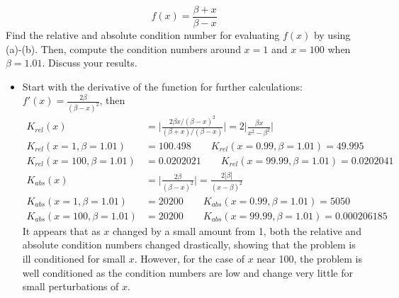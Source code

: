 \documentclass[10pt]{article}
\begin{document}
\begin{enumerate}
\begin{enumerate}[label=(\alph*)]
\begin{equation*}
				f(x) = \frac{\beta + x}{\beta - x}
			\end{equation*}
			Find the relative and absolute condition number for evaluating $f(x)$ by using (a)-(b). Then, compute the condition numbers around $x = 1$ and $x = 100$ when $\beta = 1.01$. Discuss your results.
			\begin{itemize}
				\item Start with the derivative of the function for further calculations: $ f'(x) = \frac{2\beta}{(\beta - x)^2} $, then
				\begin{align}
					K_{rel}(x) &= \bigg| \frac{2\beta x/(\beta-x)^2}{(\beta + x)/(\beta - x)} \bigg| = 2\bigg| \frac{\beta x}{x^2 - \beta^2} \bigg| \\
					K_{rel}(x=1, \beta=1.01) &= 100.498 \qquad K_{rel}(x=0.99, \beta=1.01) = 49.995 \nonumber \\
					K_{rel}(x = 100, \beta = 1.01) &= 0.0202021 \qquad K_{rel}(x = 99.99, \beta = 1.01) = 0.0202041  \nonumber \\
					K_{abs}(x) &= \bigg| \frac{2\beta}{(\beta - x)^2} \bigg| = \frac{2|\beta|}{(x-\beta)^2} \\
					K_{abs}(x = 1, \beta=1.01) &= 20200 \qquad K_{abs}(x = 0.99, \beta=1.01) = 5050 \nonumber \\
					K_{abs}(x = 100, \beta=1.01) &= 20200 \qquad K_{abs}(x = 99.99, \beta=1.01) = 0.000206185 \nonumber
				\end{align}
				It appears that as $x$ changed by a small amount from 1, both the relative and absolute condition numbers changed drastically, showing that the problem is ill conditioned for small $x$. However, for the case of $x$ near 100, the problem is well conditioned as the condition numbers are low and change very little for small perturbations of $x$.
			\end{itemize}
	\end{enumerate}
	\pagebreak



\end{enumerate}
\end{document}
